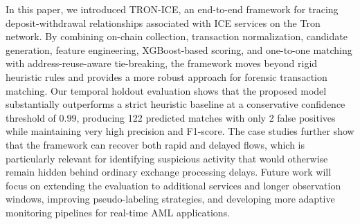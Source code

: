 \documentclass[journal]{IEEEtran}
\begin{document}
    In this paper, we introduced TRON-ICE, an end-to-end framework for tracing deposit-withdrawal relationships associated with ICE services on the Tron network. By combining on-chain collection, transaction normalization, candidate generation, feature engineering, XGBoost-based scoring, and one-to-one matching with address-reuse-aware tie-breaking, the framework moves beyond rigid heuristic rules and provides a more robust approach for forensic transaction matching. Our temporal holdout evaluation shows that the proposed model substantially outperforms a strict heuristic baseline at a conservative confidence threshold of $0.99$, producing 122 predicted matches with only 2 false positives while maintaining very high precision and F1-score. The case studies further show that the framework can recover both rapid and delayed flows, which is particularly relevant for identifying suspicious activity that would otherwise remain hidden behind ordinary exchange processing delays. Future work will focus on extending the evaluation to additional services and longer observation windows, improving pseudo-labeling strategies, and developing more adaptive monitoring pipelines for real-time AML applications.
    
\end{document}
